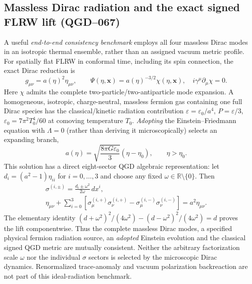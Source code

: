 \documentclass[11pt,a4paper]{article}
\begin{document}
\subsection{Massless Dirac radiation and the exact signed FLRW lift (QGD--067)}
\label{sec:qgd075-flrw-dirac}
A useful \emph{end-to-end consistency benchmark} employs all four
massless Dirac modes in an isotropic thermal ensemble, rather than an
assigned vacuum metric profile. For spatially flat FLRW in conformal
time, including its spin connection, the exact Dirac reduction is
\begin{equation}\label{eq:qgd075-flrw-Dirac}
 g_{\mu\nu}=a(\eta)^2\eta_{\mu\nu},\qquad
 \boxed{\Psi(\eta,\bm x)=a(\eta)^{-3/2}\chi(\eta,\bm x),\quad
 i\gamma^\mu\partial_\mu\chi=0.}
\end{equation}
Here $\chi$ admits the complete two-particle/two-antiparticle mode
expansion. A homogeneous, isotropic, charge-neutral, massless fermion
gas containing one full Dirac species has the classical/kinetic radiation
contribution $\varepsilon=\varepsilon_0/a^4$, $P=\varepsilon/3$,
$\varepsilon_0=7\pi^2T_0^4/60$ at comoving temperature $T_0$.
\emph{Adopting} the Einstein--Friedmann equation with $\Lambda=0$
(rather than deriving it microscopically) selects an expanding branch,
\begin{equation}\label{eq:qgd075-flrw-friedmann}
 \boxed{a(\eta)=\sqrt{\frac{8\pi G\varepsilon_0}{3}}
 (\eta-\eta_0),\qquad\eta>\eta_0.}
\end{equation}
This solution has a direct eight-sector QGD algebraic representation:
let $d_i=(a^2-1)\eta_{ii}$ for $i=0,\ldots,3$ and choose any
fixed $\omega\in\mathbb R\setminus\{0\}$. Then
\begin{equation}\label{eq:qgd075-flrw-lift}
 \boxed{\begin{gathered}
 \sigma^{(i,\pm)}=\frac{d_i\pm\omega^2}{2\omega}\,dx^i,\\
 \eta_{\mu\nu}+\sum_{i=0}^3
 \left[\sigma_\mu^{(i,+)}\sigma_\nu^{(i,+)}
 -\sigma_\mu^{(i,-)}\sigma_\nu^{(i,-)}\right]
 =a^2\eta_{\mu\nu}.
 \end{gathered}}
\end{equation}
The elementary identity
$(d+\omega^2)^2/(4\omega^2)-(d-\omega^2)^2/(4\omega^2)=d$
proves the lift componentwise. Thus the complete massless Dirac
modes, a specified physical fermion radiation source, an \emph{adopted}
Einstein evolution and the classical signed QGD metric are mutually
consistent. Neither the arbitrary factorization scale $\omega$
nor the individual $\sigma$ sectors is selected by the microscopic
Dirac dynamics. Renormalized trace-anomaly and vacuum polarization
backreaction are not part of this ideal-radiation benchmark.
\end{document}
